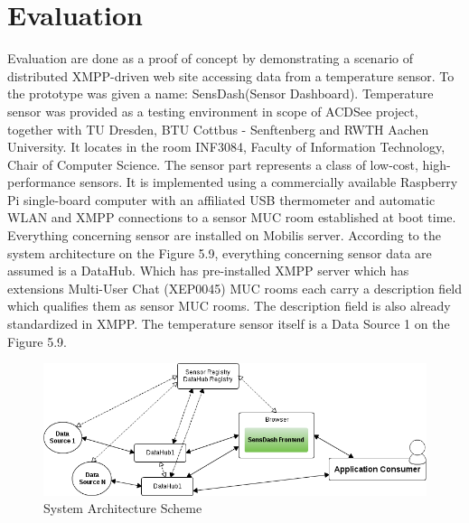 \section{Evaluation}
Evaluation are done as a proof of concept by demonstrating a scenario of distributed XMPP-driven web site accessing data from a temperature sensor. To the prototype was given a name: SensDash(Sensor Dashboard). Temperature sensor was provided as a testing environment in scope of ACDSee project, together with TU Dresden, BTU Cottbus - Senftenberg and RWTH Aachen University. It locates in the room INF3084, Faculty of Information Technology, Chair of Computer Science. The sensor part represents a class of low-cost, high-performance sensors. It is implemented using a commercially available Raspberry Pi single-board computer with an affiliated USB thermometer and automatic WLAN and XMPP connections to a sensor MUC room established at boot time. Everything concerning sensor are installed on Mobilis server. According to the system architecture on the Figure 5.9, everything concerning sensor data are assumed is a DataHub. Which has pre-installed XMPP server which has extensions Multi-User Chat (XEP0045) MUC rooms each carry a description field which qualifies them as sensor MUC rooms. The description field is also already standardized in XMPP. The temperature sensor itself is a Data Source 1 on the Figure 5.9.

        \begin{figure}[!ht]
		\centering
		\includegraphics[scale=0.6]{images/UseCaseScheme1.png}   
		\caption[Use Case System Architecture Scheme]{System Architecture Scheme}                         
		\end{figure}

